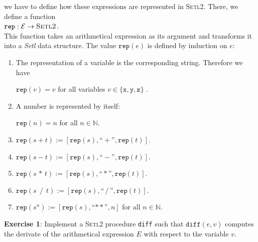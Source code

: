 \documentclass{article}
\begin{document}
we have to define how these expressions are represented in \textsc{Setl2}.
There, we define a function 
\\[0.2cm]
\hspace*{1.3cm}
$\mathtt{rep}: \mathcal{E} \rightarrow \textsc{Setl2}$.
\\[0.2cm]
This function takes an arithmetical expression as its argument and transforms it into a
\textsl{Setl} data structure.  The value $\texttt{rep}(e)$ is defined by induction on $e$:
\begin{enumerate}
\item The representation of a variable is the corresponding string.  Therefore we have

      $\texttt{rep}(v) = v$ \quad for all variables 
      $v \in \{ \mathtt{x}, \mathtt{y}, \mathtt{z} \}$ .  
\item A number is represented by itself:

      $\texttt{rep}(n) = n$ \quad for all $n \in \mathbb{N}$.
\item $\texttt{rep}(s + t) := [ \texttt{rep}(s), \textrm{``}+\textrm{''}, \texttt{rep}(t) ]$.
\item $\texttt{rep}(s - t)  := [ \texttt{rep}(s), \textrm{``}-\textrm{''}, \texttt{rep}(t) ]$.
\item $\texttt{rep}(s \,*\, t)  := [ \texttt{rep}(s), \textrm{``}*\textrm{''}, \texttt{rep}(t) ]$.
\item $\texttt{rep}(s \;\,/\,\; t)  := [ \texttt{rep}(s), \textrm{``}\,/\,\textrm{''}, \texttt{rep}(t) ]$.
\item $\texttt{rep}(s^n) := [ \texttt{rep}(s), \textrm{``}\mathtt{**}\textrm{''}, n ]$ 
      \quad for all $n \in \mathbb{N}$.
\end{enumerate}
\vspace{0.3cm}

\noindent
\textbf{Exercise 1}:
Implement a \textsc{Setl2} procedure \texttt{diff} such that 
$\texttt{diff}(e,v)$ computes the derivate of the arithmetical expression $E$ with respect to the
variable  $v$.
\vspace{0.3cm}
\end{document}

